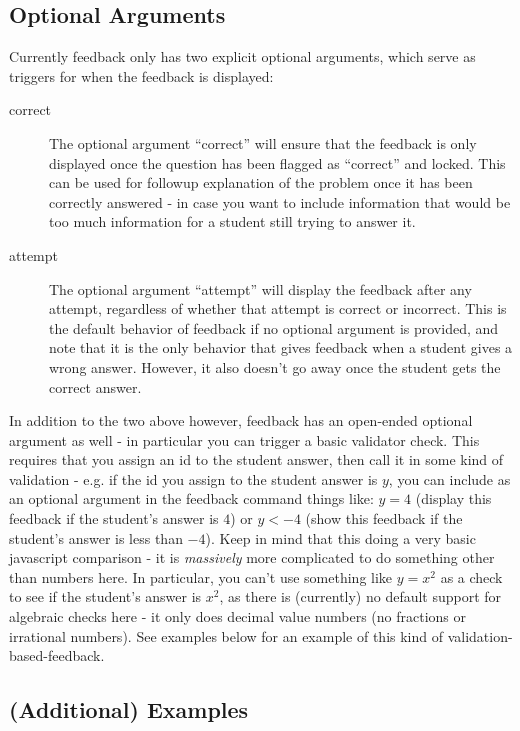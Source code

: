 \documentclass{ximera}
\begin{document}
    \subsection*{Optional Arguments}
    
        Currently feedback only has two explicit optional arguments, which serve as triggers for when the feedback is displayed:
        
        \begin{description}
            \item[correct] The optional argument ``correct'' will ensure that the feedback is only displayed once the question has been flagged as ``correct'' and locked. This can be used for followup explanation of the problem once it has been correctly answered - in case you want to include information that would be too much information for a student still trying to answer it.
            \item[attempt] The optional argument ``attempt'' will display the feedback after any attempt, regardless of whether that attempt is correct or incorrect. This is the default behavior of feedback if no optional argument is provided, and note that it is the only behavior that gives feedback when a student gives a wrong answer. However, it also doesn't go away once the student gets the correct answer.
        \end{description}
        
        In addition to the two above however, feedback has an open-ended optional argument as well - in particular you can trigger a basic validator check. This requires that you assign an id to the student answer, then call it in some kind of validation - e.g. if the id you assign to the student answer is $y$, you can include as an optional argument in the feedback command things like: $y = 4$ (display this feedback if the student's answer is $4$) or $y<-4$ (show this feedback if the student's answer is less than $-4$). Keep in mind that this doing a very basic javascript comparison - it is \textit{massively} more complicated to do something other than numbers here. In particular, you can't use something like $y=x^2$ as a check to see if the student's answer is $x^2$, as there is (currently) no default support for algebraic checks here - it only does decimal value numbers (no fractions or irrational numbers). See examples below for an example of this kind of validation-based-feedback.
        
        
    \subsection*{(Additional) Examples}
        
\end{document}
